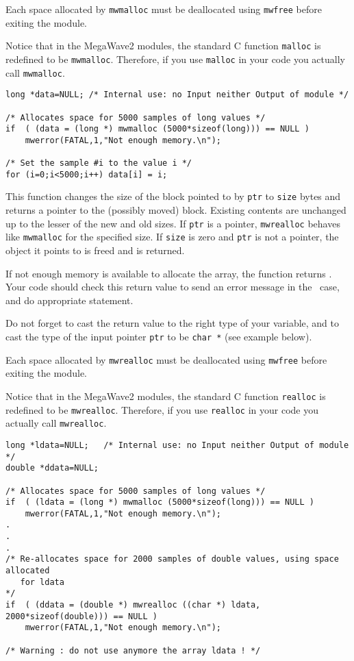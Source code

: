 Each space allocated by \verb+mwmalloc+ must be deallocated using \verb+mwfree+ before exiting the module.

Notice that in the MegaWave2 modules, the standard C function \verb+malloc+ is
redefined to be \verb+mwmalloc+. 
Therefore, if you use \verb+malloc+ in your code you actually call \verb+mwmalloc+.

\Next
\Example
\begin{verbatim}
long *data=NULL; /* Internal use: no Input neither Output of module */

/* Allocates space for 5000 samples of long values */
if  ( (data = (long *) mwmalloc (5000*sizeof(long))) == NULL )
    mwerror(FATAL,1,"Not enough memory.\n");

/* Set the sample #i to the value i */
for (i=0;i<5000;i++) data[i] = i;
\end{verbatim}

\newpage %

\Description
This function changes the size of the block pointed to by \verb+ptr+ to
\verb+size+ bytes and returns a pointer to the (possibly moved) block.  
Existing contents are unchanged up to the lesser of the new and old sizes.  
If \verb+ptr+ is a \Null pointer, \verb+mwrealloc+ behaves like 
\verb+mwmalloc+ for the specified size.  
If \verb+size+ is zero and \verb+ptr+ is not a \Null pointer, the object it points to is freed and \Null is returned.

If not enough memory is available to allocate the array, the function returns \Null. 
Your code should check this return value to send an error message in the \Null\ case, and do appropriate statement.

Do not forget to cast the return value to the right type of your variable, and to cast the type of the input pointer \verb+ptr+ to be \verb+char *+ (see example below).

Each space allocated by \verb+mwrealloc+ must be deallocated using \verb+mwfree+ before exiting the module.

Notice that in the MegaWave2 modules, the standard C function \verb+realloc+ is
redefined to be \verb+mwrealloc+. 
Therefore, if you use \verb+realloc+ in your code you actually call \verb+mwrealloc+.

\Next
\Example
\begin{verbatim}
long *ldata=NULL;   /* Internal use: no Input neither Output of module */
double *ddata=NULL;

/* Allocates space for 5000 samples of long values */
if  ( (ldata = (long *) mwmalloc (5000*sizeof(long))) == NULL )
    mwerror(FATAL,1,"Not enough memory.\n");
.
.
.
/* Re-allocates space for 2000 samples of double values, using space allocated
   for ldata 
*/
if  ( (ddata = (double *) mwrealloc ((char *) ldata, 2000*sizeof(double))) == NULL )
    mwerror(FATAL,1,"Not enough memory.\n");

/* Warning : do not use anymore the array ldata ! */
\end{verbatim}

\newpage %


